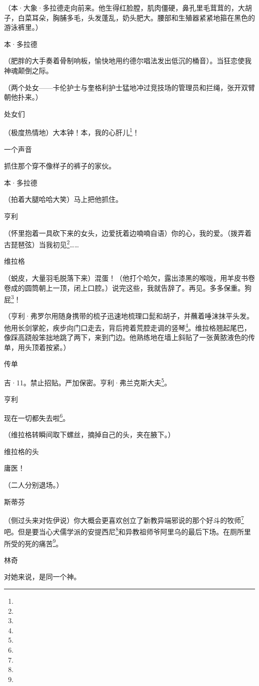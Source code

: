 \par （本·大象·多拉德走向前来。他生得红脸膛，肌肉僵硬，鼻孔里毛茸茸的，大胡子，白菜耳朵，胸脯多毛，头发蓬乱，奶头肥大。腰部和生殖器紧紧地箍在黑色的游泳裤里。）
\par 本·多拉德
\par （肥胖的大手奏着骨制响板，愉快地用约德尔唱法发出低沉的桶音）。当狂恋使我神魂颠倒之际。
\par （两个处女——卡伦护士与奎格利护士猛地冲过竞技场的管理员和拦绳，张开双臂朝他扑来。）
\par 处女们
\par （极度热情地）大本钟！本，我的心肝儿\footnote{}！
\par 一个声音
\par 抓住那个穿不像样子的裤子的家伙。
\par 本·多拉德
\par （拍着大腿哈哈大笑）马上把他抓住。
\par 亨利
\par （怀里抱着一具砍下来的女头，边爱抚着边喃喃自语）你的心，我的爱。（拨弄着古琵琶弦）当我初见\footnote{}……
\par 维拉格
\par （蜕皮，大量羽毛脱落下来）混蛋！（他打个哈欠，露出漆黑的喉咙，用羊皮书卷卷成的圆筒朝上一顶，闭上口腔。）说完这些，我就告辞了。再见。多多保重。狗屁\footnote{}！
\par （亨利·弗罗尔用随身携带的梳子迅速地梳理口髭和胡子，并蘸着唾沫抹平头发。他用长剑掌舵，疾步向门口走去，背后挎着荒腔走调的竖琴\footnote{}。维拉格翘起尾巴，像踩高跷般笨拙地跳了两下，来到门边。他熟练地在墙上斜贴了一张黄脓液色的传单，用头顶着按紧。）
\par 传单
\par 吉·11。禁止招贴。严加保密。亨利·弗兰克斯大夫\footnote{}。
\par 亨利
\par 现在一切都失去啦\footnote{}。
\par （维拉格转瞬间取下螺丝，摘掉自己的头，夹在腋下。）
\par 维拉格的头
\par 庸医！
\par （二人分别退场。）
\par 斯蒂芬
\par （侧过头来对佐伊说）你大概会更喜欢创立了新教异端邪说的那个好斗的牧师\footnote{}吧。但是要当心犬儒学派的安提西尼\footnote{}和异教祖师爷阿里乌的最后下场。在厕所里所受的死的痛苦\footnote{}。
\par 林奇
\par 对她来说，是同一个神。
